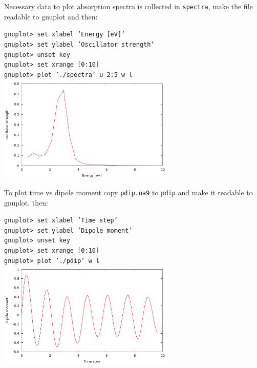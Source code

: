 \documentclass[10pt]{beamer}
\begin{document}
\begin{frame}

\small{Necessary data to plot absorption spectra is collected in {\tt spectra}, make the file readable to gnuplot and then:\\}
\vspace*{0.2cm}

\small{{\tt gnuplot> set xlabel 'Energy [eV]'\\
gnuplot> set ylabel 'Oscillator strength'\\
gnuplot> unset key \\
gnuplot>  set xrange [0:10]\\
gnuplot>  plot './spectra' u 2:5 w l
}}\\

\centering
\includegraphics[width=8.5cm]{fig/spectrana9} 

\end{frame}

\begin{frame}

\small{To plot time vs dipole moment copy {\tt pdip.na9} to {\tt pdip} and make it readable to gnuplot, then:\\}
\vspace*{0.2cm}

\small{{\tt gnuplot> set xlabel 'Time step'\\
gnuplot> set ylabel 'Dipole moment'\\
gnuplot> unset key \\
gnuplot>  set xrange [0:10]\\
gnuplot>  plot './pdip'  w l
}}\\

\centering
\includegraphics[width=8.5cm]{fig/dipolena9} 

\end{frame}
\end{document}
